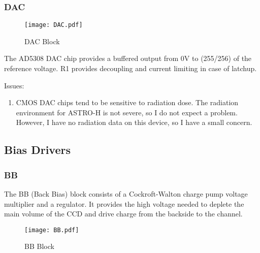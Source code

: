\documentclass[a4paper,12pt]{article}
\begin{document}
\subsubsection{DAC}
   \begin{figure}
   \begin{center}
   \texttt{[image: DAC.pdf]}
   \end{center}
   \caption{DAC Block}
   \end{figure}
The AD5308 DAC chip provides a buffered output from 0V to (255/256) of the reference voltage. R1 provides decoupling and current limiting in case of latchup.

Issues:
\begin{enumerate}
\item
CMOS DAC chips tend to be sensitive to radiation dose. The radiation environment for ASTRO-H is not severe, so I do not expect a problem. However, I have no radiation data on this device, so I have a small concern.
\end{enumerate}

\subsection{Bias Drivers}
\subsubsection{BB}

The BB (Back Bias) block consists of a Cockroft-Walton charge pump voltage multiplier and a regulator. It provides the high voltage needed to deplete the main volume of the CCD and drive charge from the backside to the channel.

   \begin{figure}
   \begin{center}
   \texttt{[image: BB.pdf]}
   \end{center}
   \caption{BB Block}
   \end{figure}
\end{document}
